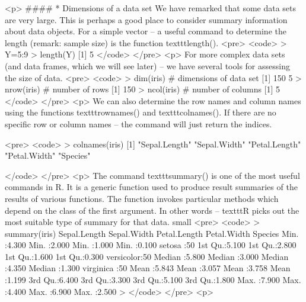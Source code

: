 

<p>
####        * {Dimensions of a data set}
We have remarked that some data sets are very large. This is perhaps a good place to consider summary information about data objects.
For a simple vector – a useful command to determine the length (remark: sample size) is the function texttt{length()}.
<pre>
<code>
> Y=5:9
> length(Y)
[1] 5
</code>
</pre>
<p>
For more complex data sets (and data frames, which we will see later) – we have several tools for assessing the size of data.
<pre>
<code>
> dim(iris)  # dimensions of data set
[1] 150   5
> nrow(iris) # number of rows
[1] 150
> ncol(iris) # number of columns
[1] 5
</code>
</pre>
<p>
We can also determine the row names and column names using the functions texttt{rownames()} and texttt{colnames()}.
If there are no specific row or column names – the command will just return the indices.

<pre>
<code>
> colnames(iris)
[1] "Sepal.Length" "Sepal.Width"  "Petal.Length" "Petal.Width"  "Species"

</code>
</pre>
<p>
The command texttt{summary()} is one of the most useful commands in R. It is a generic function used to produce result summaries of the results of various functions. The function invokes particular methods which depend on the class of the first argument. 
In other words – texttt{R} picks out the most suitable type of summary for that data.
{
	small
<pre>
<code>
> summary(iris)
  Sepal.Length    Sepal.Width     Petal.Length    Petal.Width          Species  
 Min.   :4.300   Min.   :2.000   Min.   :1.000   Min.   :0.100   setosa    :50  
 1st Qu.:5.100   1st Qu.:2.800   1st Qu.:1.600   1st Qu.:0.300   versicolor:50  
 Median :5.800   Median :3.000   Median :4.350   Median :1.300   virginica :50  
 Mean   :5.843   Mean   :3.057   Mean   :3.758   Mean   :1.199                  
 3rd Qu.:6.400   3rd Qu.:3.300   3rd Qu.:5.100   3rd Qu.:1.800                  
 Max.   :7.900   Max.   :4.400   Max.   :6.900   Max.   :2.500                  
>
</code>
</pre>
<p>
}

